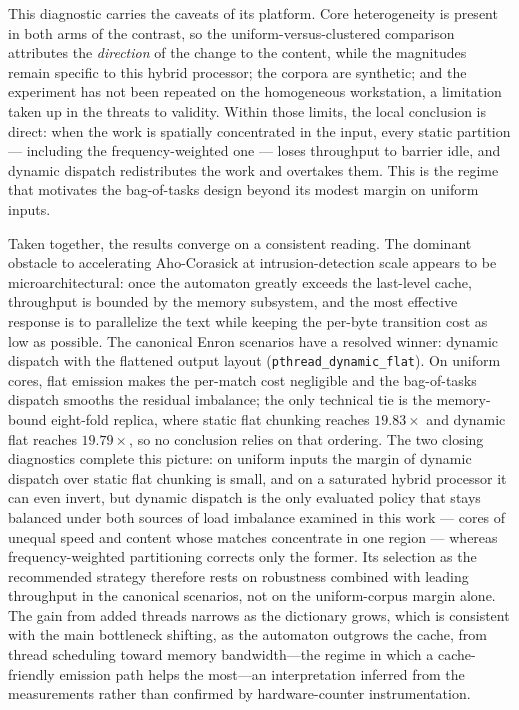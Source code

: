 This diagnostic carries the caveats of its platform. Core heterogeneity is
present in both arms of the contrast, so the uniform-versus-clustered comparison
attributes the \emph{direction} of the change to the content, while the
magnitudes remain specific to this hybrid processor; the corpora are synthetic;
and the experiment has not been repeated on the homogeneous workstation, a
limitation taken up in the threats to validity. Within those limits, the local
conclusion is direct: when the work is spatially concentrated in the input,
every static partition --- including the frequency-weighted one --- loses
throughput to barrier idle, and dynamic dispatch redistributes the work and
overtakes them. This is the regime that motivates the bag-of-tasks design beyond
its modest margin on uniform inputs.


Taken together, the results converge on a consistent reading. The dominant obstacle
to accelerating Aho-Corasick at intrusion-detection scale appears to be
microarchitectural: once the automaton greatly exceeds the last-level cache,
throughput is bounded by the memory subsystem, and the most effective response is
to parallelize the text while keeping the per-byte transition cost as low as
possible. The canonical Enron scenarios have a resolved winner: dynamic dispatch
with the flattened output layout (\texttt{pthread\_dynamic\_flat}). On uniform
cores, flat emission makes the per-match cost negligible and the bag-of-tasks
dispatch smooths the residual imbalance; the only technical tie is the
memory-bound eight-fold replica, where static flat chunking reaches
$19.83\times$ and dynamic flat reaches $19.79\times$, so no conclusion relies on
that ordering. The two closing diagnostics complete this picture: on uniform
inputs the margin of dynamic dispatch over static flat chunking is small, and on
a saturated hybrid processor it can even invert, but dynamic dispatch is the only
evaluated policy that stays balanced under both sources of load imbalance
examined in this work --- cores of unequal speed and content whose matches
concentrate in one region --- whereas frequency-weighted partitioning corrects
only the former. Its selection as the recommended strategy therefore rests on
robustness combined with leading throughput in the canonical scenarios, not on
the uniform-corpus margin alone. The gain from added threads narrows as the dictionary grows, which
is consistent with the main bottleneck shifting, as the automaton outgrows the
cache, from thread scheduling toward memory bandwidth---the regime in which a
cache-friendly emission path helps the most---an interpretation inferred from the
measurements rather than confirmed by hardware-counter instrumentation.

